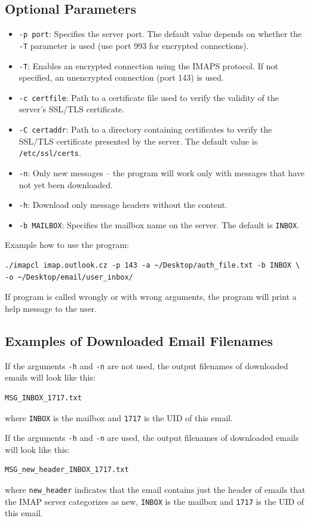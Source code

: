\documentclass[a4paper,11pt]{article}
\begin{document}
\subsection{Optional Parameters}
\begin{itemize}
    \item \texttt{-p port}: Specifies the server port. The default value depends on whether the \texttt{-T} parameter is used (use port 993 for encrypted connections).
    \item \texttt{-T}: Enables an encrypted connection using the IMAPS protocol. If not specified, an unencrypted connection (port 143) is used.
    \item \texttt{-c certfile}: Path to a certificate file used to verify the validity of the server’s SSL/TLS certificate.
    \item \texttt{-C certaddr}: Path to a directory containing certificates to verify the SSL/TLS certificate presented by the server. The default value is \texttt{/etc/ssl/certs}.
    \item \texttt{-n}: Only new messages – the program will work only with messages that have not yet been downloaded.
    \item \texttt{-h}: Download only message headers without the content.
    \item \texttt{-b MAILBOX}: Specifies the mailbox name on the server. The default is \texttt{INBOX}.
\end{itemize}

Example how to use the program:

\begin{verbatim}
./imapcl imap.outlook.cz -p 143 -a ~/Desktop/auth_file.txt -b INBOX \
-o ~/Desktop/email/user_inbox/
\end{verbatim}

If program is called wrongly or with wrong arguments, the program will print a help message to the user.

\subsection{Examples of Downloaded Email Filenames}
If the arguments \texttt{-h} and \texttt{-n} are not used, the output filenames of downloaded emails will look like this:
\begin{verbatim}
MSG_INBOX_1717.txt
\end{verbatim}
where \texttt{INBOX} is the mailbox and \texttt{1717} is the UID of this email.

If the arguments \texttt{-h} and \texttt{-n} are used, the output filenames of downloaded emails will look like this:
\begin{verbatim}
MSG_new_header_INBOX_1717.txt
\end{verbatim}
where \texttt{new\_header} indicates that the email contains just the header of emails that the IMAP server categorizes as new, \texttt{INBOX} is the mailbox and \texttt{1717} is the UID of this email.
\end{document}
